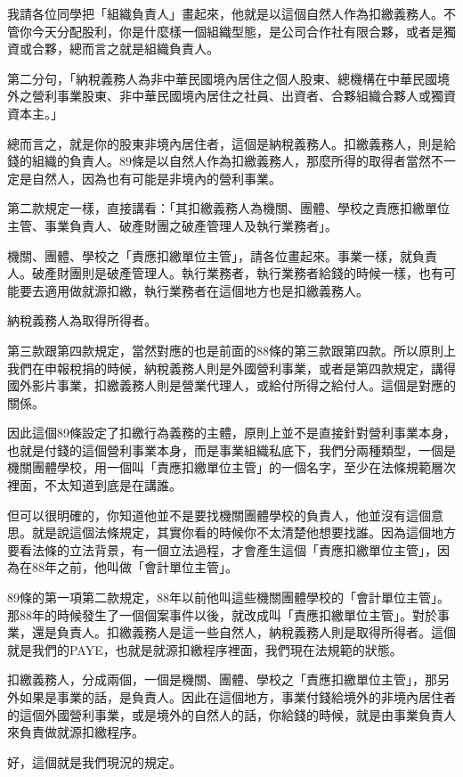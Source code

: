 \documentclass[oneside,sub3section]{ctexbook}
\begin{document}
我請各位同學把「組織負責人」畫起來，他就是以這個自然人作為扣繳義務人。不管你今天分配股利，你是什麼樣一個組織型態，是公司合作社有限合夥，或者是獨資或合夥，總而言之就是組織負責人。

第二分句，「納稅義務人為非中華民國境內居住之個人股東、總機構在中華民國境外之營利事業股東、非中華民國境內居住之社員、出資者、合夥組織合夥人或獨資資本主。」

總而言之，就是你的股東非境內居住者，這個是納稅義務人。扣繳義務人，則是給錢的組織的負責人。89條是以自然人作為扣繳義務人，那麼所得的取得者當然不一定是自然人，因為也有可能是非境內的營利事業。

第二款規定一樣，直接講看：「其扣繳義務人為機關、團體、學校之責應扣繳單位主管、事業負責人、破產財團之破產管理人及執行業務者」。

機關、團體、學校之「責應扣繳單位主管」，請各位畫起來。事業一樣，就負責人。破產財團則是破產管理人。執行業務者，執行業務者給錢的時候一樣，也有可能要去適用做就源扣繳，執行業務者在這個地方也是扣繳義務人。

納稅義務人為取得所得者。

第三款跟第四款規定，當然對應的也是前面的88條的第三款跟第四款。所以原則上我們在申報稅捐的時候，納稅義務人則是外國營利事業，或者是第四款規定，講得國外影片事業，扣繳義務人則是營業代理人，或給付所得之給付人。這個是對應的關係。

因此這個89條設定了扣繳行為義務的主體，原則上並不是直接針對營利事業本身，也就是付錢的這個營利事業本身，而是事業組織私底下，我們分兩種類型，一個是機關團體學校，用一個叫「責應扣繳單位主管」的一個名字，至少在法條規範層次裡面，不太知道到底是在講誰。

但可以很明確的，你知道他並不是要找機關團體學校的負責人，他並沒有這個意思。就是說這個法條規定，其實你看的時候你不太清楚他想要找誰。因為這個地方要看法條的立法背景，有一個立法過程，才會產生這個「責應扣繳單位主管」，因為在88年之前，他叫做「會計單位主管」。

89條的第一項第二款規定，88年以前他叫這些機關團體學校的「會計單位主管」。那88年的時候發生了一個個案事件以後，就改成叫「責應扣繳單位主管」。對於事業，還是負責人。扣繳義務人是這一些自然人，納稅義務人則是取得所得者。這個就是我們的PAYE，也就是就源扣繳程序裡面，我們現在法規範的狀態。

扣繳義務人，分成兩個，一個是機關、團體、學校之「責應扣繳單位主管」，那另外如果是事業的話，是負責人。因此在這個地方，事業付錢給境外的非境內居住者的這個外國營利事業，或是境外的自然人的話，你給錢的時候，就是由事業負責人來負責做就源扣繳程序。

好，這個就是我們現況的規定。
\end{document}
